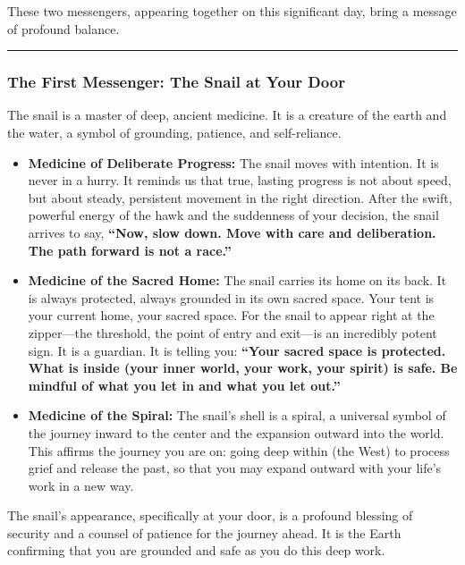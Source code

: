 \documentclass{article}
\begin{document}
These two messengers, appearing together on this significant day, bring
a message of profound balance.

\begin{center}\rule{0.5\linewidth}{0.5pt}\end{center}

\subsubsection*{The First Messenger: The Snail at Your
Door}\label{the-first-messenger-the-snail-at-your-door}

The snail is a master of deep, ancient medicine. It is a creature of the
earth and the water, a symbol of grounding, patience, and self-reliance.

\begin{itemize}
\item
  \textbf{Medicine of Deliberate Progress:} The snail moves with
  intention. It is never in a hurry. It reminds us that true, lasting
  progress is not about speed, but about steady, persistent movement in
  the right direction. After the swift, powerful energy of the hawk and
  the suddenness of your decision, the snail arrives to say,
  \textbf{``Now, slow down. Move with care and deliberation. The path
  forward is not a race.''}
\item
  \textbf{Medicine of the Sacred Home:} The snail carries its home on
  its back. It is always protected, always grounded in its own sacred
  space. Your tent is your current home, your sacred space. For the
  snail to appear right at the zipper---the threshold, the point of
  entry and exit---is an incredibly potent sign. It is a guardian. It is
  telling you: \textbf{``Your sacred space is protected. What is inside
  (your inner world, your work, your spirit) is safe. Be mindful of what
  you let in and what you let out.''}
\item
  \textbf{Medicine of the Spiral:} The snail's shell is a spiral, a
  universal symbol of the journey inward to the center and the expansion
  outward into the world. This affirms the journey you are on: going
  deep within (the West) to process grief and release the past, so that
  you may expand outward with your life's work in a new way.
\end{itemize}

The snail's appearance, specifically at your door, is a profound
blessing of security and a counsel of patience for the journey ahead. It
is the Earth confirming that you are grounded and safe as you do this
deep work.
\end{document}
